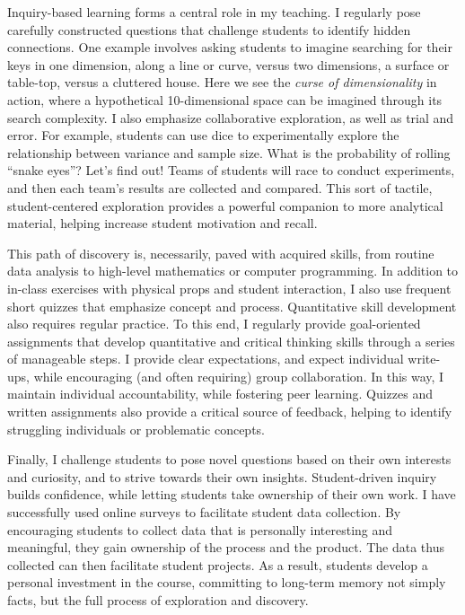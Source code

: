 \documentclass[12pt]{article}
\begin{document}
Inquiry-based learning forms a central role in my teaching.
I regularly pose carefully constructed 
questions that challenge students to identify hidden connections. 
One example involves asking students to imagine searching for 
their keys in one dimension,
along a line or curve, versus two dimensions, a surface or
table-top, versus a cluttered house.  Here we see the {\em 
curse of dimensionality} in action, where a hypothetical 
10-dimensional space can be imagined through its search 
complexity.  
I also emphasize collaborative exploration, as well as trial and error.
For example, students can use dice to experimentally explore the 
relationship between variance and sample size. What is the 
probability of rolling ``snake eyes''? Let's find out!
Teams of students will race to conduct experiments, and then 
each team's results are collected and compared.
This sort of tactile, student-centered exploration provides 
a powerful companion to more analytical material, 
helping increase student motivation and recall.

This path of discovery is, necessarily, paved 
with acquired skills, from routine data analysis to 
high-level mathematics or computer programming. 
In addition to in-class exercises with physical props 
and student interaction, I also use frequent short quizzes 
that emphasize concept and process. 
Quantitative skill development also requires 
regular practice. To this end, I regularly provide 
goal-oriented assignments that develop quantitative and 
critical thinking skills through a series of manageable steps. 
I provide clear expectations, and expect individual write-ups, 
while encouraging (and often requiring) group collaboration. 
In this way, I maintain individual accountability, while fostering
peer learning. Quizzes and written assignments
also provide a critical source of feedback, 
helping to identify struggling individuals or 
problematic concepts.

Finally, I challenge students to pose novel questions based on
their own interests and curiosity, and to strive 
towards their own insights. 
Student-driven inquiry builds confidence, 
while letting students take ownership of their own work.
I have successfully used online surveys to facilitate student 
data collection. By encouraging students to collect data that 
is personally interesting and meaningful, they gain ownership
of the process and the product.
The data thus collected can then facilitate student
projects. As a result, students develop a personal investment 
in the course, committing to long-term memory not simply facts, 
but the full process of exploration and discovery.
\end{document}
